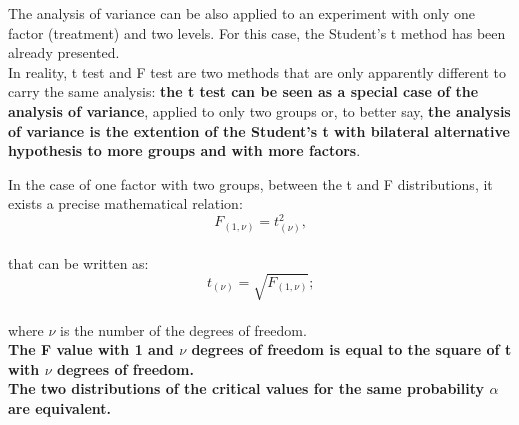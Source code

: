 
\begin{frame}
  \vspace*{.5cm} 
  The analysis of variance can be also applied to an experiment with only one factor (treatment) and two levels. For this case, the Student's t method has been already presented.\\
  \vspace*{.5cm}
  In reality, t test and F test are two methods that are only apparently different to carry the same analysis:  \textbf{the t test can be seen as a special case of the analysis of variance}, applied to only two groups or, to better say, \textbf{the analysis of variance is the extention of the Student's t with bilateral alternative hypothesis to more groups and with more factors}.
\end{frame}

\begin{frame}
  \vspace*{.25cm} 
  In the case of one factor with two groups, between the t and F distributions, it exists a precise mathematical relation:\\
  $$ F_{(1,\nu)}=t^2_{(\nu)} \mbox{,} $$\\
  that can be written as:\\
  $$ t_{(\nu)}=\sqrt{F_{(1,\nu)}} \mbox{;} $$\\
  where $ \nu $ is the number of the degrees of freedom. \\
  \vspace*{.25cm}
  \textbf{The F value with 1 and {\boldmath $ \nu $} degrees of freedom is equal to the square of t with {\boldmath $ \nu $} degrees of freedom.}\\
  \vspace*{.25cm}
\textbf{The two distributions of the critical values for the same probability {\boldmath $ \alpha $} are equivalent.}
\end{frame}




